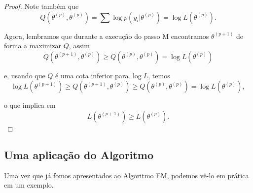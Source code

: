 \documentclass{article}
\begin{document}
\begin{proof}
    Note também que
    \[Q\left(\theta^{(p)}, \theta^{(p)}\right) = \sum \log{p\left(y_i | \theta^{(p)}\right)} = \log{L\left(\theta^{(p)}\right)}.\]
    
    Agora, lembramos que durante a execução do passo M encontramos $\theta^{(p + 1)}$ de forma a maximizar $Q$, assim
    \[Q\left(\theta^{(p + 1)}, \theta^{(p)}\right) \geq Q\left(\theta^{(p)}, \theta^{(p)}\right) = \log{L\left(\theta^{(p)}\right)}\]
    
    \noindent e, usando que $Q$ é uma cota inferior para $\log{L}$, temos
    \[\log{L\left(\theta^{(p + 1)}\right)} \geq Q\left(\theta^{(p + 1)}, \theta^{(p)}\right) \geq Q\left(\theta^{(p)}, \theta^{(p)}\right) = \log{L\left(\theta^{(p)}\right)},\]
    
    \noindent o que implica em
    \[L\left(\theta^{(p + 1)}\right) \geq L\left(\theta^{(p)}\right).\]
\end{proof}

\subsection*{Uma aplicação do Algoritmo}

Uma vez que já fomos apresentados ao Algoritmo EM, podemos vê-lo em prática em um exemplo.
\end{document}
